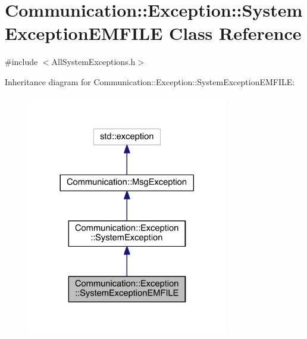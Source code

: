 \hypertarget{class_communication_1_1_exception_1_1_system_exception_e_m_f_i_l_e}{}\section{Communication\+:\+:Exception\+:\+:System\+Exception\+E\+M\+F\+I\+L\+E Class Reference}
\label{class_communication_1_1_exception_1_1_system_exception_e_m_f_i_l_e}


{\ttfamily \#include $<$All\+System\+Exceptions.\+h$>$}



Inheritance diagram for Communication\+:\+:Exception\+:\+:System\+Exception\+E\+M\+F\+I\+L\+E\+:\nopagebreak
\begin{figure}[H]
\begin{center}
\leavevmode
\includegraphics[width=248pt]{class_communication_1_1_exception_1_1_system_exception_e_m_f_i_l_e__inherit__graph}
\end{center}
\end{figure}


